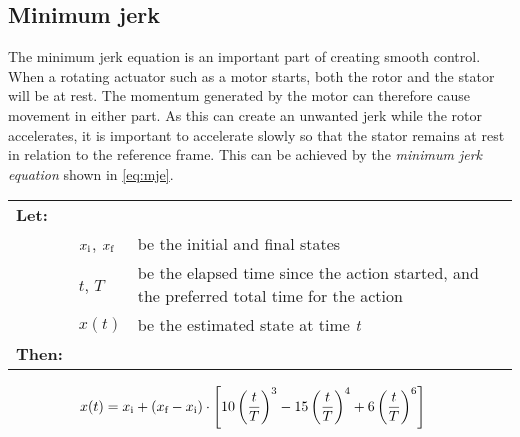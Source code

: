\documentclass[11pt]{article}
\begin{document}
\subsection{Minimum jerk}
The minimum jerk equation is an important part of creating smooth control. When a rotating actuator such as a motor starts, both the rotor and the stator will be at rest. The momentum generated by the motor can therefore cause movement in either part. As this can create an unwanted jerk while the rotor accelerates, it is important to accelerate slowly so that the stator remains at rest in relation to the reference frame. This can be achieved by the \emph{minimum jerk equation} shown in \vref{eq:mje}.
\par \vspace{10pt}
{\footnotesize
  \begin{tabular}{l l l}
    \textbf{Let:} \\
 &$x_\textup{i}$, $x_\textup{f}$ &be the initial and final states\\
 &$t$, $T$ &be the elapsed time since the action started, and the preferred total time for the action  \\
 &$x(t)$ &be the estimated state at time \emph{t} \\
    \textbf{Then:}
  \end{tabular}
  \begin{align}
    x(t) &= x_\textup{i} +  (x_\textup{f} - x_\textup{i}) \cdot \left[10\left(\frac{t}{T}\right)^3 - 15\left(\frac{t}{T}\right)^4 + 6\left(\frac{t}{T}\right)^6 \right]\label{eq:mje}          
  \end{align}}
\end{document}
